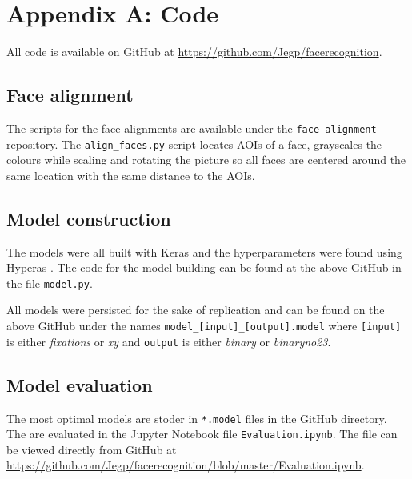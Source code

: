 \documentclass{llncs}
\begin{document}
\clearpage

\section*{Appendix A: Code}
\label{appendix:code}

All code is available on GitHub at \url{https://github.com/Jegp/facerecognition}.

\subsection*{Face alignment}
The scripts for the face alignments are available under the \texttt{face-alignment} repository.
The \texttt{align\_faces.py} script locates AOIs of a face, grayscales the colours while scaling and rotating the picture so all faces
are centered around the same location with the same distance to the AOIs.

\subsection*{Model construction}
The models were all built with Keras \cite{keras} and the hyperparameters were found using Hyperas \cite{hyperas}.
The code for the model building can be found at the above GitHub in the file \texttt{model.py}.

All models were persisted for the sake of replication and can be found on the above GitHub under the names \texttt{model\_[input]\_[output].model} where \texttt{[input]} is either \textit{fixations} or \textit{xy} and \texttt{output} is either \textit{binary} or \textit{binaryno23}.

\subsection*{Model evaluation}
The most optimal models are stoder in \texttt{*.model} files in the GitHub directory. The are evaluated in the Jupyter Notebook file \texttt{Evaluation.ipynb}. The file can be viewed directly from GitHub at \url{https://github.com/Jegp/facerecognition/blob/master/Evaluation.ipynb}.

\clearpage
\end{document}
